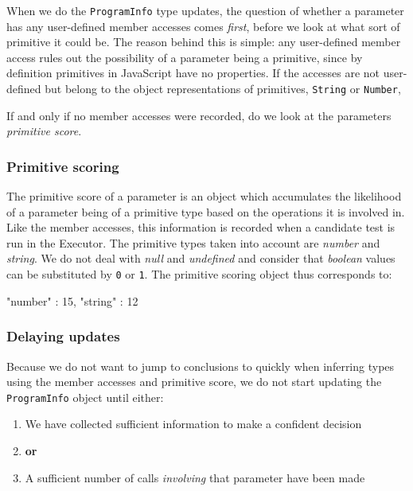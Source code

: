 When we do the \texttt{ProgramInfo} type updates, the question of whether a parameter has any user-defined member accesses comes \emph{first}, before we look at what sort of primitive it could be. The reason behind this is simple: any user-defined member access rules out the possibility of a parameter being a primitive, since by definition primitives in JavaScript have no properties. If the accesses are not user-defined but belong to the object representations of primitives, \texttt{String} or \texttt{Number}, 

If and only if no member accesses were recorded, do we look at the parameters \emph{primitive score}.

\subsubsection{Primitive scoring}
The primitive score of a parameter is an object which accumulates the likelihood of a parameter being of a primitive type based on the operations it is involved in. Like the member accesses, this information is recorded when a candidate test is run in the \textsf{Executor}. The primitive types taken into account are \emph{number} and \emph{string}. We do not deal with \emph{null} and \emph{undefined} and consider that \emph{boolean} values can be substituted by \texttt{0} or \texttt{1}. The primitive scoring object thus corresponds to:

\begin{code}[caption=Primitive scoring, label=primitivescore]
   {
      "number" : 15,
      "string" : 12
   }
\end{code}

\subsubsection{Delaying updates}
Because we do not want to jump to conclusions to quickly when inferring types using the member accesses and primitive score, we do not start updating the \texttt{ProgramInfo} object until either:

\begin{enumerate}
   \item We have collected sufficient information to make a confident decision
   \item[] \textbf{or}
   \item A sufficient number of calls \emph{involving} that parameter have been made
\end{enumerate}


